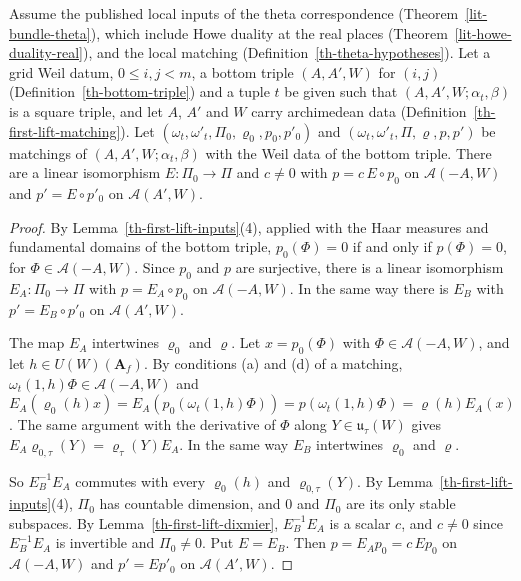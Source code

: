 \begin{lemma}\label{th-first-lift-unique}
Assume the published local inputs of the theta correspondence
(Theorem~\ref{lit-bundle-theta}), which include Howe duality at the real places
(Theorem~\ref{lit-howe-duality-real}), and the local matching
(Definition~\ref{th-theta-hypotheses}). Let a grid Weil
datum, $0\leq i,j<m$, a bottom triple $(A,A',W)$ for $(i,j)$
(Definition~\ref{th-bottom-triple}) and a tuple $t$ be given such that
$(A,A',W;\alpha_t,\beta)$ is a square triple, and let $A$, $A'$ and $W$ carry
archimedean data (Definition~\ref{th-first-lift-matching}). Let
$(\omega_t,\omega'_t,\Pi_0,\varrho_0,p_0,p'_0)$ and
$(\omega_t,\omega'_t,\Pi,\varrho,p,p')$ be matchings of
$(A,A',W;\alpha_t,\beta)$ with the Weil data of the bottom triple. There are a
linear isomorphism $E\colon\Pi_0\to\Pi$ and $c\neq0$ with $p=c\,E\circ p_0$ on
$\mathcal A(-A,W)$ and $p'=E\circ p'_0$ on $\mathcal A(A',W)$.
\end{lemma}
\begin{proof}
By Lemma~\ref{th-first-lift-inputs}(4), applied with the Haar measures and
fundamental domains of the bottom triple, $p_0(\Phi)=0$ if and only if
$p(\Phi)=0$, for $\Phi\in\mathcal A(-A,W)$. Since $p_0$ and $p$ are
surjective, there is a linear isomorphism $E_A\colon\Pi_0\to\Pi$ with
$p=E_A\circ p_0$ on $\mathcal A(-A,W)$. In the same way there is $E_B$ with
$p'=E_B\circ p'_0$ on $\mathcal A(A',W)$.

The map $E_A$ intertwines $\varrho_0$ and $\varrho$. Let $x=p_0(\Phi)$ with
$\Phi\in\mathcal A(-A,W)$, and let $h\in U(W)(\mathbf A_f)$. By conditions (a)
and (d) of a matching, $\omega_t(1,h)\Phi\in\mathcal A(-A,W)$ and
$E_A(\varrho_0(h)x)=E_A(p_0(\omega_t(1,h)\Phi))=p(\omega_t(1,h)\Phi)=\varrho(h)E_A(x)$.
The same argument with the derivative of $\Phi$ along $Y\in\mathfrak u_\tau(W)$
gives $E_A\varrho_{0,\tau}(Y)=\varrho_\tau(Y)E_A$. In the same way $E_B$
intertwines $\varrho_0$ and $\varrho$.

So $E_B^{-1}E_A$ commutes with every $\varrho_0(h)$ and $\varrho_{0,\tau}(Y)$. By
Lemma~\ref{th-first-lift-inputs}(4), $\Pi_0$ has countable dimension, and $0$
and $\Pi_0$ are its only stable subspaces. By
Lemma~\ref{th-first-lift-dixmier}, $E_B^{-1}E_A$ is a scalar $c$, and $c\neq0$
since $E_B^{-1}E_A$ is invertible and $\Pi_0\neq0$. Put $E=E_B$. Then
$p=E_Ap_0=c\,Ep_0$ on $\mathcal A(-A,W)$ and $p'=Ep'_0$ on $\mathcal A(A',W)$.
\end{proof}

